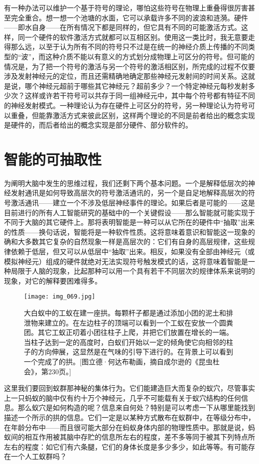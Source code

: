 有一种办法可以维护一个基于符号的理论，哪怕这些符号在物理上重叠得很厉害甚至完全重合。想一想一个池塘的水面，它可以承载许多不同的波浪和涟漪。硬件——即水自身——在所有情况下都是同样的，但它具有不同的可能激活方式。这样，同一个硬件的软件激活方式就都可以互相区别。使用这一类比时，我无意要走得那么远，以至于认为所有不同的符号只不过是在统一的神经介质上传播的不同类型的“波”，而这种介质不能以有意义的方式划分成物理上可区分的符号。但可能的情况是，为了把一个符号的激活与另一个符号的激活相区别，所完成的过程不仅要涉及发射神经元的定位，而且还需精确地确定那些神经元发射间的时间关系。这就是说，哪个神经元超前于哪些其它神经元？超前多少？一个特定神经元每秒发射多少次？这样或许若干符号可以共存于同一组神经元中，其中每个符号都有特征不同的神经发射模式。一种理论认为存在硬件上可区分的符号，另一种理论认为符号可以重叠，但能靠激活方式来彼此区别，这样两个理论的不同是前者给出的概念实现是硬件的，而后者给出的概念实现是部分硬件、部分软件的。

\section{智能的可抽取性}

为阐明大脑中发生的思维过程，我们还剩下两个基本问题。一个是解释低层次的神经发射通讯是如何导致高层次的符号激活通讯的，另一个是自足地解释高层次的符号激活通讯——建立一个不涉及低层神经事件的理论。如果后者是可能的——这是目前进行的所有人工智能研究的基础中的一个关键假设——那么智能就可能实现于不同于大脑的其它硬件上。那将表明智能是一种可以从它所在的硬件中“抽取”出来的性质——换句话说，智能将是一种软件性质。这将意味着意识和智能这一现象的确和大多数其它复杂的自然现象一样是高层次的：它们有自身的高层规律，这些规律依赖于低层，但又可以从低层中“抽取”出来。相反，如果没有全部由神经元（或模拟神经元）组成的硬件就绝对无法实现符号触发模式的话，这将意味着智能是一种局限于人脑的现象，比起那种可以用一个具有若干不同层次的规律体系来说明的现象，对它的解释要困难得多。

\begin{figure}
\texttt{[image: img\_069.jpg]}
\caption[结队的工蚁在建一座拱。]
  {大白蚁中的工蚁在建一座拱。每颗杆子都是通过添加小团的泥土和排泄物来建立的。在左边柱子的顶端可以看到一个工蚁在安放一个圆粪团。其它工蚁正叨着小团往柱子上爬，并把它们放置在增长的一端。当柱子达到一定的高度时，白蚁们开始以一定的倾角使它向相邻的柱子的方向伸展，这显然是在气味的引导下进行的。在背景上可以看到一个完成了的拱。[图立德·何达布勒画，摘自成尔逊的《昆虫杜会》，第230页。]}
\end{figure}

这里我们要回到蚁群那神秘的集体行为。它们能建造巨大而复杂的蚁穴，尽管事实上一只蚂蚁的脑中仅有约十万个神经元，几乎不可能载有关于蚁穴结构的任何信息。那么蚁穴是如何构造的呢？信息来自何处？特别是可以考虑一下从哪里能找到描述一个所示的拱的信息。它们一定是以某种方式散布在蚁群中，在等级分布中，在年龄分布中——而且很可能大部分在蚂蚁身体内部的物理性质中。那就是说，蚂蚁间的相互作用被其脑中存贮的信息所左右的程度，差不多等同于被其下列特点所左右的程度：如它们有六条腿，它们的身体长度是多少多少，如此等等。有可能存在一个人工蚁群吗？

